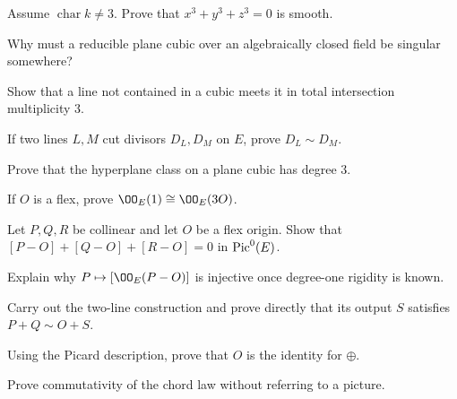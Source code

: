 \begin{exercise}\label{exr:vi43-02}
Assume \(\operatorname{char}k\neq3\).  Prove that \(x^3+y^3+z^3=0\) is smooth.
\end{exercise}

\begin{exercise}\label{exr:vi43-03}
Why must a reducible plane cubic over an algebraically closed field be singular somewhere?
\end{exercise}

\begin{exercise}\label{exr:vi43-04}
Show that a line not contained in a cubic meets it in total intersection multiplicity \(3\).
\end{exercise}

\begin{exercise}\label{exr:vi43-05}
If two lines \(L,M\) cut divisors \(D_L,D_M\) on \(E\), prove \(D_L\sim D_M\).
\end{exercise}

\begin{exercise}\label{exr:vi43-06}
Prove that the hyperplane class on a plane cubic has degree \(3\).
\end{exercise}

\begin{exercise}\label{exr:vi43-07}
If \(O\) is a flex, prove \(\OO_E(1)\cong\OO_E(3O)\).
\end{exercise}

\begin{exercise}\label{exr:vi43-08}
Let \(P,Q,R\) be collinear and let \(O\) be a flex origin.  Show that \([P-O]+[Q-O]+[R-O]=0\) in \(\operatorname{Pic}^0(E)\).
\end{exercise}

\begin{exercise}\label{exr:vi43-09}
Explain why \(P\mapsto[\OO_E(P-O)]\) is injective once degree-one rigidity is known.
\end{exercise}

\begin{exercise}\label{exr:vi43-10}
Carry out the two-line construction and prove directly that its output \(S\) satisfies \(P+Q\sim O+S\).
\end{exercise}

\begin{exercise}\label{exr:vi43-11}
Using the Picard description, prove that \(O\) is the identity for \(\oplus\).
\end{exercise}

\begin{exercise}\label{exr:vi43-12}
Prove commutativity of the chord law without referring to a picture.
\end{exercise}

